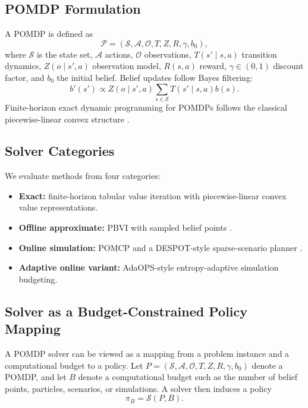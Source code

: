 \documentclass[10pt,twocolumn]{article}
\begin{document}
\subsection{POMDP Formulation}
A POMDP is defined as
\begin{equation}
\mathcal{P}=(\mathcal{S},\mathcal{A},\mathcal{O},T,Z,R,\gamma,b_0),
\end{equation}
where $\mathcal{S}$ is the state set, $\mathcal{A}$ actions, $\mathcal{O}$ observations, $T(s'\mid s,a)$ transition dynamics, $Z(o\mid s',a)$ observation model, $R(s,a)$ reward, $\gamma\in(0,1)$ discount factor, and $b_0$ the initial belief.
Belief updates follow Bayes filtering:
\begin{equation}
 b'(s') \propto Z(o\mid s',a)\sum_{s\in\mathcal{S}} T(s'\mid s,a)b(s).
\end{equation}
Finite-horizon exact dynamic programming for POMDPs follows the classical piecewise-linear convex structure \citep{smallwood1973optimal,littman1994witness}.

\subsection{Solver Categories}
We evaluate methods from four categories:
\begin{itemize}
    \item \textbf{Exact:} finite-horizon tabular value iteration with piecewise-linear convex value representations.
    \item \textbf{Offline approximate:} PBVI with sampled belief points \citep{pineau2003pbvi}.
    \item \textbf{Online simulation:} POMCP and a DESPOT-style sparse-scenario planner \citep{silver2010pomcp,somani2013despot}.
    \item \textbf{Adaptive online variant:} AdaOPS-style entropy-adaptive simulation budgeting.
\end{itemize}

\subsection{Solver as a Budget-Constrained Policy Mapping}
A POMDP solver can be viewed as a mapping from a problem instance and a computational budget to a policy. Let
\(
P=(\mathcal{S},\mathcal{A},\mathcal{O},T,Z,R,\gamma,b_0)
\)
denote a POMDP, and let $B$ denote a computational budget such as the number of belief points, particles, scenarios, or simulations. A solver then induces a policy
\begin{equation}
\pi_B = \mathcal{S}(P,B).
\end{equation}
\end{document}
